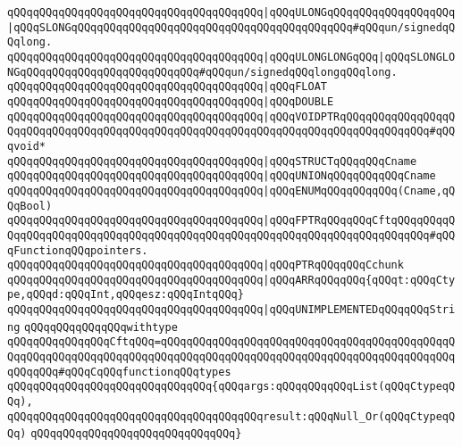 \verb|qQQqqQQqqQQqqQQqqQQqqQQqqQQqqQQqqQQqqQQq|\verb#|qQQqULONGqQQqqQQqqQQqqQQqqQQq|qQQqSLONGqQQqqQQqqQQqqQQqqQQqqQQqqQQqqQQqqQQqqQQqqQQq#\verb|#qQQqun/signedqQQqlong.|\newline
\verb|qQQqqQQqqQQqqQQqqQQqqQQqqQQqqQQqqQQqqQQq|\verb#|qQQqULONGLONGqQQq|qQQqSLONGLONGqQQqqQQqqQQqqQQqqQQqqQQqqQQq#\verb|#qQQqun/signedqQQqlongqQQqlong.|\newline
\verb|qQQqqQQqqQQqqQQqqQQqqQQqqQQqqQQqqQQqqQQq|\verb#|qQQqFLOAT#\newline
\verb|qQQqqQQqqQQqqQQqqQQqqQQqqQQqqQQqqQQqqQQq|\verb#|qQQqDOUBLE#\newline
\verb|qQQqqQQqqQQqqQQqqQQqqQQqqQQqqQQqqQQqqQQq|\verb#|qQQqVOIDPTRqQQqqQQqqQQqqQQqqQQqqQQqqQQqqQQqqQQqqQQqqQQqqQQqqQQqqQQqqQQqqQQqqQQqqQQqqQQqqQQqqQQq#\verb|#qQQqvoid*|\newline
\verb|qQQqqQQqqQQqqQQqqQQqqQQqqQQqqQQqqQQqqQQq|\verb#|qQQqSTRUCTqQQqqQQqCname#\newline
\verb|qQQqqQQqqQQqqQQqqQQqqQQqqQQqqQQqqQQqqQQq|\verb#|qQQqUNIONqQQqqQQqqQQqCname#\newline
\verb|qQQqqQQqqQQqqQQqqQQqqQQqqQQqqQQqqQQqqQQq|\verb#|qQQqENUMqQQqqQQqqQQq(Cname,qQQqBool)#\newline
\verb|qQQqqQQqqQQqqQQqqQQqqQQqqQQqqQQqqQQqqQQq|\verb#|qQQqFPTRqQQqqQQqCftqQQqqQQqqQQqqQQqqQQqqQQqqQQqqQQqqQQqqQQqqQQqqQQqqQQqqQQqqQQqqQQqqQQqqQQqqQQq#\verb|#qQQqFunctionqQQqpointers.|\newline
\verb|qQQqqQQqqQQqqQQqqQQqqQQqqQQqqQQqqQQqqQQq|\verb#|qQQqPTRqQQqqQQqCchunk#\newline
\verb|qQQqqQQqqQQqqQQqqQQqqQQqqQQqqQQqqQQqqQQq|\verb#|qQQqARRqQQqqQQq{qQQqt:qQQqCtype,qQQqd:qQQqInt,qQQqesz:qQQqIntqQQq}#\newline
\verb|qQQqqQQqqQQqqQQqqQQqqQQqqQQqqQQqqQQqqQQq|\verb#|qQQqUNIMPLEMENTEDqQQqqQQqString#\newline
\newline
\verb|qQQqqQQqqQQqqQQqwithtype|\newline
\verb|qQQqqQQqqQQqqQQqCftqQQq=qQQqqQQqqQQqqQQqqQQqqQQqqQQqqQQqqQQqqQQqqQQqqQQqqQQqqQQqqQQqqQQqqQQqqQQqqQQqqQQqqQQqqQQqqQQqqQQqqQQqqQQqqQQqqQQqqQQqqQQqqQQq#qQQqCqQQqfunctionqQQqtypes|\newline
\verb|qQQqqQQqqQQqqQQqqQQqqQQqqQQqqQQq{qQQqargs:qQQqqQQqqQQqList(qQQqCtypeqQQq),|\newline
\verb|qQQqqQQqqQQqqQQqqQQqqQQqqQQqqQQqqQQqqQQqresult:qQQqNull_Or(qQQqCtypeqQQq)|\newline
\verb|qQQqqQQqqQQqqQQqqQQqqQQqqQQqqQQq}|\newline
